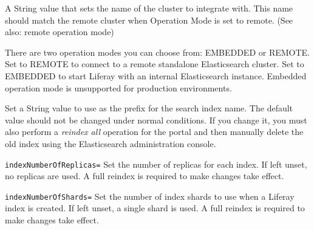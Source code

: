 \begin{description}
\tightlist
\item[\texttt{clusterName=LiferayElasticsearchCluster}]
A String value that sets the name of the cluster to integrate with. This
name should match the remote cluster when Operation Mode is set to
remote. (See also: remote operation mode)
\item[\texttt{operationMode=EMBEDDED}]
There are two operation modes you can choose from: EMBEDDED or REMOTE.
Set to REMOTE to connect to a remote standalone Elasticsearch cluster.
Set to EMBEDDED to start Liferay with an internal Elasticsearch
instance. Embedded operation mode is unsupported for production
environments.
\item[\texttt{indexNamePrefix=liferay-}]
Set a String value to use as the prefix for the search index name. The
default value should not be changed under normal conditions. If you
change it, you must also perform a \emph{reindex all} operation for the
portal and then manually delete the old index using the Elasticsearch
administration console.
\end{description}

\texttt{indexNumberOfReplicas=} Set the number of replicas for each
index. If left unset, no replicas are used. A full reindex is required
to make changes take effect.

\texttt{indexNumberOfShards=} Set the number of index shards to use when
a Liferay index is created. If left unset, a single shard is used. A
full reindex is required to make changes take effect.

